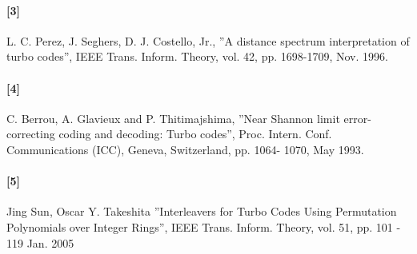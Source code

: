 \documentclass[20 pts]{article}
\begin{document}
\paragraph{[3]}  L. C. Perez, J. Seghers, D. J. Costello, Jr., ''A distance spectrum interpretation of turbo codes'', IEEE Trans. Inform. Theory, vol. 42, pp. 1698-1709, Nov. 1996.\\
\paragraph{[4]}  C. Berrou, A. Glavieux and P. Thitimajshima, ''Near Shannon limit error-correcting coding and
decoding: Turbo codes'', Proc. Intern. Conf. Communications (ICC), Geneva, Switzerland, pp. 1064-
1070, May 1993. \\
\paragraph{[5]}  Jing Sun, Oscar Y. Takeshita ''Interleavers for Turbo Codes Using Permutation Polynomials over Integer Rings'', IEEE Trans. Inform. Theory, vol. 51, pp. 101 - 119  Jan. 2005\\
\end{document}
